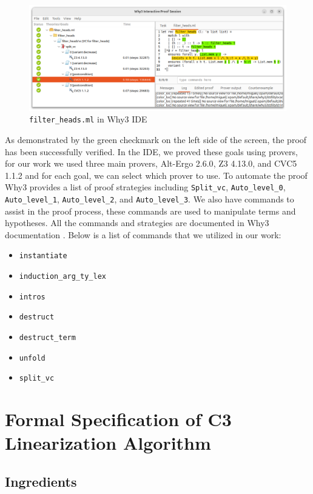 \documentclass[runningheads]{llncs}
\begin{document}
\begin{figure}[htbp]
  \centering
  \includegraphics[width=1\textwidth]{images/Why3FilterHeads.png}
  \caption{\texttt{filter\_heads.ml} in Why3 IDE}
  \label{fig:Why3FilterHeads}
\end{figure}
As demonstrated by the green checkmark on the left side of the screen, the proof has been successfully verified. 
In the IDE, we proved these goals using provers, for our work we used three main provers,
 Alt-Ergo 2.6.0\autocite{sasAltErgoSMTSolver}, Z3 4.13.0\autocite{Z3ProverZ32025}, and CVC5 1.1.2\autocite{Cvc5} and for each goal, we can select which prover to use. To automate the proof Why3 provides a list of proof strategies including \texttt{Split\_vc}, \texttt{Auto\_level\_0}, \texttt{Auto\_level\_1}, 
\texttt{Auto\_level\_2}, and \texttt{Auto\_level\_3}. We also have commands to assist in the proof process, these commands are used to manipulate terms and hypotheses. All the commands and strategies are documented in Why3 documentation \autocite{12TechnicalInformations}.
Below is a list of commands that we utilized in our work:
\begin{itemize}
  \item \texttt{instantiate} 
  \item \texttt{induction\_arg\_ty\_lex}
  \item \texttt{intros} 
  \item \texttt{destruct}
  \item \texttt{destruct\_term}
  \item \texttt{unfold}
  \item \texttt{split\_vc}
\end{itemize}

\section{Formal Specification of C3 Linearization Algorithm}


\subsection{Ingredients}
\end{document}
